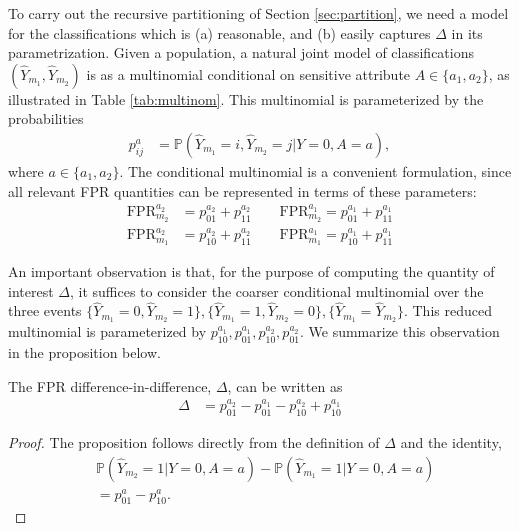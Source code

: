 \documentclass[11pt, sigconf, svgnames]{acmart}
\renewcommand{\P}{\mathbb{P}}
\begin{document}
To carry out the recursive partitioning of Section \ref{sec:partition}, we need
a model for the classifications which is (a) reasonable, and (b) easily
captures $\Delta$ in its parametrization.  Given a population, a natural
joint model of classifications
$(\hat{Y}_{m_1}, \hat{Y}_{m_2})$ is as a multinomial conditional on sensitive
attribute $A \in \{a_1,a_2\}$, as illustrated in Table \ref{tab:multinom}. This multinomial is parameterized by the probabilities
\begin{align*}
  p_{ij}^a &= \P(\hat{Y}_{m_1}=i, \hat{Y}_{m_2}=j| Y=0, A=a),
\end{align*}
where $a\in\{a_1,a_2\}$.  The conditional multinomial is a convenient
formulation, since all relevant FPR quantities can be represented in terms of
these parameters:
\begin{align*}
  \mathrm{FPR}_{m_2}^{a_2} &= p_{01}^{a_2} + p_{11}^{a_2}\qquad
  \mathrm{FPR}_{m_2}^{a_1} = p_{01}^{a_1} + p_{11}^{a_1}\\
  \mathrm{FPR}_{m_1}^{a_2} &= p_{10}^{a_2} + p_{11}^{a_2}\qquad
  \mathrm{FPR}_{m_1}^{a_1} = p_{10}^{a_1} + p_{11}^{a_1}
\end{align*}

An important observation is that, for the purpose of computing the quantity of interest $\Delta$, it suffices to consider the coarser conditional multinomial over the three events
$\{\hat{Y}_{m_1}=0,\hat{Y}_{m_2}=1\}, \{\hat{Y}_{m_1}=1,\hat{Y}_{m_2}=0\},
\{\hat{Y}_{m_1}=\hat{Y}_{m_2}\}$. This reduced multinomial is parameterized by
$p_{10}^{a_1}, p_{01}^{a_1}, p_{10}^{a_2}, p_{01}^{a_2}$.  We summarize this observation in the proposition below.  

\begin{proposition}
  The FPR difference-in-difference, $\Delta$, can be written as
 \begin{align*}
  \Delta &= 
  p_{01}^{a_2} - p_{01}^{a_1} - p_{10}^{a_2} +p_{10}^{a_1} 
\end{align*}
\end{proposition}
\begin{proof}
  The proposition follows directly from the definition of $\Delta$ and the
  identity,
\begin{align*}
  &\P(\hat{Y}_{m_2}=1|Y=0,A=a) - \P(\hat{Y}_{m_1}=1|Y=0,A=a)\\
  &= p_{01}^a - p_{10}^a.
\end{align*}
\vspace{-1em}
\end{proof}
\end{document}
